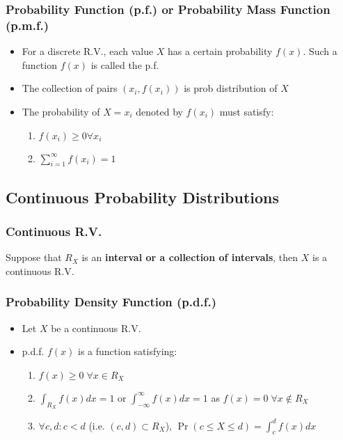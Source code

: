 \documentclass[10pt]{article}
\begin{document}
\subsubsection*{Probability Function (p.f.) or Probability Mass Function (p.m.f.)}
\begin{itemize}
    \item For a discrete R.V., each value $X$ has a certain probability $f(x)$. Such a function $f(x)$ is called the p.f.
    \item The collection of pairs $(x_i, f(x_i))$ is prob distribution of $X$
    \item The probability of $X=x_i$ denoted by $f(x_i)$ must satisfy:
          \begin{enumerate}
              \item $f(x_i) \geq 0 \forall x_i$
              \item $\sum_{i=1}^{\infty}f(x_i)=1$
          \end{enumerate}
\end{itemize}
\subsection*{Continuous Probability Distributions}
\subsubsection*{Continuous R.V.}
Suppose that $R_X$ is an \textbf{interval or a collection of intervals}, then $X$ is a continuous R.V.
\subsubsection*{Probability Density Function (p.d.f.)}
\begin{itemize}
    \item Let $X$ be a continuous R.V.
    \item p.d.f. $f(x)$ is a function satisfying:
          \begin{enumerate}
              \item $f(x) \geq 0 \;\forall x \in R_X$
              \item $\int_{R_X}^{}f(x)dx = 1$ or $\int_{-\infty}^{\infty}f(x)dx = 1$ as $f(x) = 0 \;\forall x \notin R_X$
              \item $\forall c, d : c < d$ (i.e. $(c, d) \subset R_X$),
                    $\Pr(c\leq X \leq d) = \int_{c}^{d}f(x)dx$
          \end{enumerate}
\end{itemize}
\end{document}
